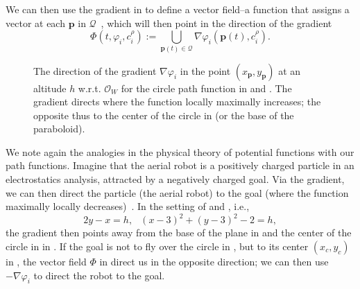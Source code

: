 We can then use the gradient in  to define a vector field--a function that assigns a vector at each $\mathbf{p}$ in $\mathcal{Q}$~\citep{lavalle2006planning}, which will then point in the direction of the gradient
\begin{equation}\label{eq:vec-field-def}
  \varPhi(t,\varphi_i,c_i^\rho):=\bigcup\limits_{\mathbf{p}(t)\in\mathcal{Q}}{\nabla\varphi_i(\mathbf{p}(t),c_i^\rho)}.
\end{equation}

\begin{figure}[ht!]
  \centering
  \selectfont
  
  \caption[Direction of the gradient on a circle path function]{The direction of the gradient $\nabla\varphi_i$ in the point $(x_\mathbf{p},y_{\mathbf{p}})$ at an altitude $h$ w.r.t. $\mathcal{O}_W$ for the circle path function in  and . The gradient directs where the function locally maximally increases; the opposite thus to the center of the circle in  (or the base of the paraboloid).}
  \label{fig:grad}
\end{figure}
We note again the analogies in the physical theory of potential functions with our path functions. 
Imagine that the aerial robot is a positively charged particle in an electrostatics analysis, attracted by a negatively charged goal. Via the gradient, we can then direct the particle (the aerial robot) to the goal (where the function maximally locally decreases)~\citep{choset2005principles}. In the setting of  and , i.e., 
\begin{equation}\label{eq:two-paths}
  2y-x=h,\,\,\,\ (x-3)^2+(y-3)^2-2=h,
\end{equation}
the gradient then points away from the base of the plane in  and the center of the circle in  in . If the goal is not to fly over the circle in , but to its center $(x_c,y_c)$ in , the vector field $\varPhi$ in  direct us in the opposite direction; we can then use $-\nabla\varphi_i$ to direct the robot to the goal.

